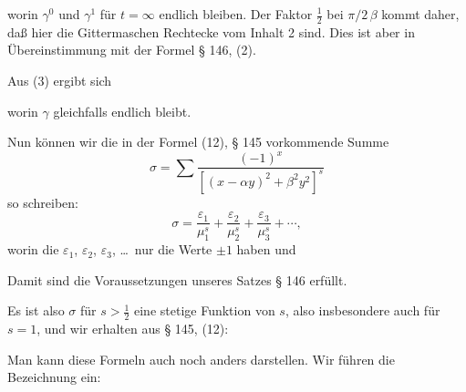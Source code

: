 

worin $\gamma^0$ und $\gamma^1$ für $t=\infty$ endlich bleiben. Der Faktor $\frac{1}{2}$ bei
$\pi/2\,\beta$ kommt daher, daß hier die Gittermaschen Rechtecke vom Inhalt 2 sind. Dies ist
aber in Übereinstimmung mit der Formel § 146, (2).

Aus (3) ergibt sich


worin $\gamma$ gleichfalls endlich bleibt.

Nun können wir die in der Formel (12), § 145 vorkommende Summe
\[
\sigma = \sum \frac{(-1)^x}{[(x-\alpha y)^2 + \beta^2 y^2]^s}
\]
so schreiben:
\[
\sigma = \frac{\varepsilon_1}{\mu_1^s} + \frac{\varepsilon_2}{\mu_2^s} + \frac{\varepsilon_3}{\mu_3^s} + \cdots,
\]
worin die $\varepsilon_1$, $\varepsilon_2$, $\varepsilon_3$, \dots\ nur die Werte $\pm 1$ haben und


Damit sind die Voraussetzungen unseres Satzes § 146 erfüllt.

Es ist also $\sigma$ für $s > \frac{1}{2}$ eine stetige Funktion von $s$, also
insbesondere auch für $s=1$, und wir erhalten aus § 145, (12):

Man kann diese Formeln auch noch anders darstellen. Wir führen die Bezeichnung ein:

